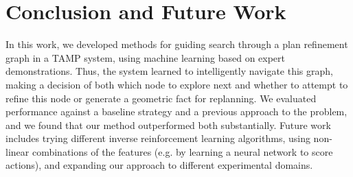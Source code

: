 \section{Conclusion and Future Work}
In this work, we developed methods for guiding search
through a plan refinement graph in a TAMP system, using machine
learning based on expert demonstrations. Thus, the system learned to
intelligently navigate this graph, making a decision of both which node
to explore next and whether to attempt to refine this node or generate
a geometric fact for replanning. We evaluated performance against a baseline
strategy and a previous approach to the problem, and we found that
our method outperformed both substantially. Future work includes trying
different inverse reinforcement learning algorithms, using non-linear
combinations of the features (e.g. by learning a neural network to score actions),
and expanding our approach to different experimental domains.